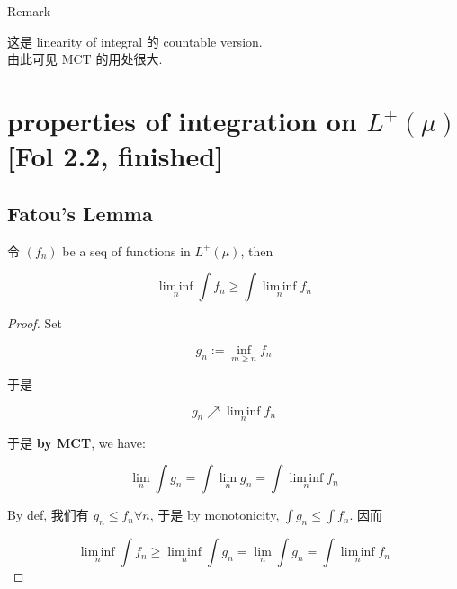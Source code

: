 \begin{qlremark}{Remark}

这是 linearity of integral 的 countable version.\\
由此可见 MCT 的用处很大.

\end{qlremark}

\section{\texorpdfstring{properties of integration on \(L^{+}(\mu)\) {[}Fol 2.2, finished{]}}{properties of integration on L\^{}\{+\}(\textbackslash mu) {[}Fol 2.2, finished{]}}}

\subsection{Fatou's Lemma}\label{fatous-lemma}

\begin{theorem}{}

令 \((f_{n})\) be a seq of functions in \(L^{+}(\mu)\), then

\[\operatorname{lim\, inf}\limits_{n}\int f_{n} \geq \int\operatorname{lim\, inf}\limits_{n}f_{n}\]

\end{theorem}

\begin{proof}

Set

\[g_{n} := \inf\limits_{m \geq n}f_{n}\]

于是

\[g_{n}\operatorname{\nearrow }\operatorname{lim\, inf}\limits_{n}f_{n}\]

于是 \textbf{by MCT}, we have:

\[\lim\limits_{n}\int g_{n} = \int\lim\limits_{n}g_{n} = \int\operatorname{lim\, inf}\limits_{n}f_{n}\]

By def, 我们有 \(g_{n} \leq f_{n}\forall n\), 于是 by monotonicity, \(\int g_{n} \leq \int f_{n}\). 因而

\[\operatorname{lim\, inf}\limits_{n}\int f_{n} \geq \operatorname{lim\, inf}\limits_{n}\int g_{n} = \lim\limits_{n}\int g_{n} = \int\operatorname{lim\, inf}\limits_{n}f_{n}\]

\end{proof}

